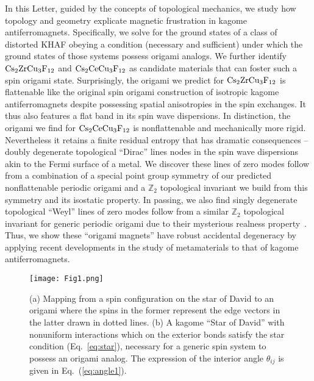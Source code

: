 \documentclass[a4paper,aps,prl,twocolumn,floatfix,showpacs,superscriptaddress]{revtex4-1}
\begin{document}
In this Letter, guided by the concepts of topological mechanics, we study how topology and geometry explicate magnetic frustration in kagome antiferromagnets. Specifically, we solve for the ground states of a class of distorted KHAF obeying a condition (necessary and sufficient) under which the ground states of those systems possess origami analogs. We further identify ${\rm Cs}_2{\rm ZrCu}_3{\rm F}_{12}$ and ${\rm Cs}_2{\rm CeCu}_3{\rm F}_{12}$ as candidate materials that can foster such a spin origami state. Surprisingly, the origami we predict for ${\rm Cs}_2{\rm ZrCu}_3{\rm F}_{12}$ is flattenable like the original spin origami construction of isotropic kagome antiferromagnets despite possessing spatial anisotropies in the spin exchanges. It thus also features a flat band in its spin wave dispersions. In distinction, the origami we find for ${\rm Cs}_2{\rm CeCu}_3{\rm F}_{12}$ is nonflattenable and mechanically more rigid. Nevertheless it retains a finite residual entropy that has dramatic consequences -- doubly degenerate topological ``Dirac'' lines nodes in the spin wave dispersions akin to the Fermi surface of a metal. We discover these lines of zero modes follow from a combination of a special point group symmetry of our predicted nonflattenable periodic origami and a $\mathbb{Z}_2$ topological invariant we build from this symmetry and its isostatic property. In passing, we also find singly degenerate topological ``Weyl'' lines of zero modes follow from a similar $\mathbb{Z}_2$ topological invariant for generic periodic origami due to their mysterious realness property~\cite{chen2016topological}. Thus, we show these ``origami magnets'' have robust accidental degeneracy by applying recent developments in the study of metamaterials to that of kagome antiferromagnets.  

\begin{figure}
\centering
 \texttt{[image: Fig1.png]}
 \caption{(a) Mapping from a spin configuration on the star of David to an origami where the spins in the former represent the edge vectors in the latter drawn in dotted lines. (b) A kagome ``Star of David'' with nonuniform interactions which on the exterior bonds satisfy the star condition (Eq.~\ref{eq:star}), necessary for a generic spin system to possess an origami analog. The expression of the interior angle $\theta_{ij}$ is given in Eq.~(\ref{eq:angle1}).}
 \label{figg1}
\end{figure}
\end{document}

